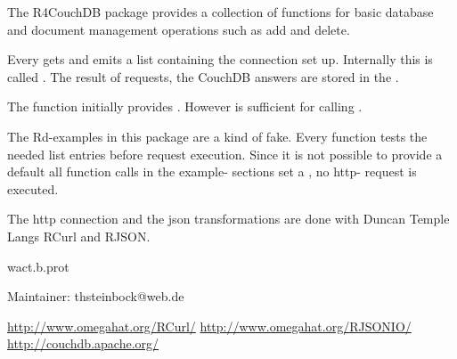 \begin{Description}\relax
The R4CouchDB package provides a collection of functions for
basic database and document management operations such as add and
delete.
\end{Description}
\begin{Details}\relax
{}
Every  gets and emits a list containing the connection
set up. Internally this  is called . The result
of  requests, the CouchDB answers are stored in the
.

The function  initially provides
. However  is sufficient for calling .

The Rd-examples in this package are a kind of fake. Every
function tests the needed list entries before request execution. Since
it is not possible to provide a default  all
function calls in the example- sections set a , no http- request is executed.

The http connection and the json transformations are done with Duncan
Temple Langs RCurl and RJSON.
\end{Details}
\begin{Author}\relax
wact.b.prot

Maintainer: thsteinbock@web.de
\end{Author}
\begin{References}\relax
\url{  http://www.omegahat.org/RCurl/}
\url{  http://www.omegahat.org/RJSONIO/}
\url{  http://couchdb.apache.org/}
\end{References}
\begin{Examples}
\end{Examples}

